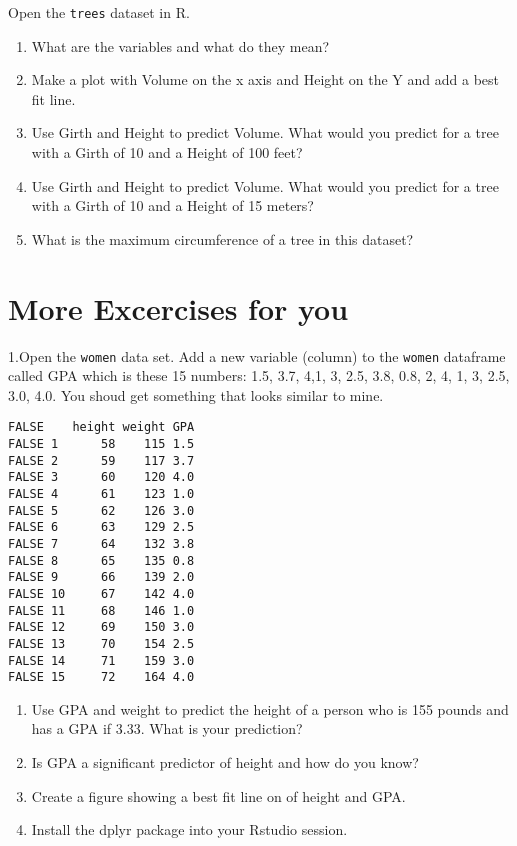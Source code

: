 \documentclass[
]{book}
\providecommand{\tightlist}{%
  \setlength{\itemsep}{0pt}\setlength{\parskip}{0pt}}
\begin{document}
Open the \texttt{trees} dataset in R.

\begin{enumerate}
\def\labelenumi{\arabic{enumi}.}
\tightlist
\item
  What are the variables and what do they mean?
\item
  Make a plot with Volume on the x axis and Height on the Y and add a best fit line.
\item
  Use Girth and Height to predict Volume. What would you predict for a tree with a Girth of 10 and a Height of 100 feet?
\item
  Use Girth and Height to predict Volume. What would you predict for a tree with a Girth of 10 and a Height of 15 meters?
\item
  What is the maximum circumference of a tree in this dataset?
\end{enumerate}

\hypertarget{more-excercises-for-you}{%
\section{\texorpdfstring{More Excercises for \textbf{you}}{More Excercises for you}}\label{more-excercises-for-you}}

1.Open the \texttt{women} data set. Add a new variable (column) to the \texttt{women} dataframe called GPA which is these 15 numbers: 1.5, 3.7, 4,1, 3, 2.5, 3.8, 0.8, 2, 4, 1, 3, 2.5, 3.0, 4.0. You shoud get something that looks similar to mine.

\begin{verbatim}
FALSE    height weight GPA
FALSE 1      58    115 1.5
FALSE 2      59    117 3.7
FALSE 3      60    120 4.0
FALSE 4      61    123 1.0
FALSE 5      62    126 3.0
FALSE 6      63    129 2.5
FALSE 7      64    132 3.8
FALSE 8      65    135 0.8
FALSE 9      66    139 2.0
FALSE 10     67    142 4.0
FALSE 11     68    146 1.0
FALSE 12     69    150 3.0
FALSE 13     70    154 2.5
FALSE 14     71    159 3.0
FALSE 15     72    164 4.0
\end{verbatim}

\begin{enumerate}
\def\labelenumi{\arabic{enumi}.}
\setcounter{enumi}{1}
\item
  Use GPA and weight to predict the height of a person who is 155 pounds and has a GPA if 3.33. What is your prediction?
\item
  Is GPA a significant predictor of height and how do you know?
\item
  Create a figure showing a best fit line on of height and GPA.
\item
  Install the dplyr package into your Rstudio session.
\end{enumerate}
\end{document}

